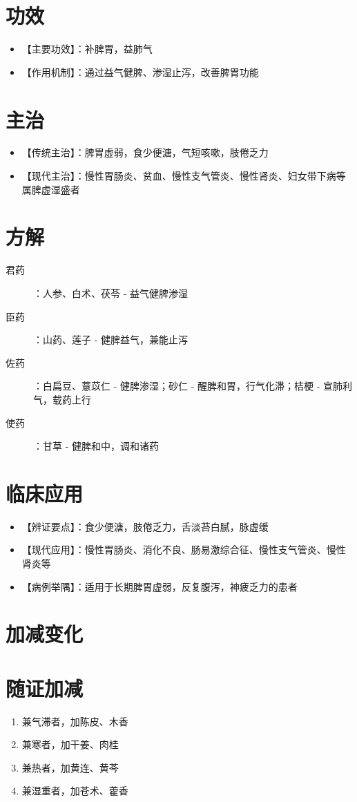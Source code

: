 \documentclass[12pt,UTF8]{ctexbook}
\newenvironment{fangji}[1]{\section{#1}\begin{enumerate}[leftmargin=2cm]}{\end{enumerate}}
\begin{document}
\section{功效}
\begin{itemize}
	\item 【主要功效】：补脾胃，益肺气
	\item 【作用机制】：通过益气健脾、渗湿止泻，改善脾胃功能
\end{itemize}

\section{主治}
\begin{itemize}
	\item 【传统主治】：脾胃虚弱，食少便溏，气短咳嗽，肢倦乏力
	\item 【现代主治】：慢性胃肠炎、贫血、慢性支气管炎、慢性肾炎、妇女带下病等属脾虚湿盛者
\end{itemize}

\section{方解}
\begin{description}
	\item[君药]：人参、白术、茯苓 - 益气健脾渗湿
	\item[臣药]：山药、莲子 - 健脾益气，兼能止泻
	\item[佐药]：白扁豆、薏苡仁 - 健脾渗湿；砂仁 - 醒脾和胃，行气化滞；桔梗 - 宣肺利气，载药上行
	\item[使药]：甘草 - 健脾和中，调和诸药
\end{description}

\section{临床应用}
\begin{itemize}
	\item 【辨证要点】：食少便溏，肢倦乏力，舌淡苔白腻，脉虚缓
	\item 【现代应用】：慢性胃肠炎、消化不良、肠易激综合征、慢性支气管炎、慢性肾炎等
	\item 【病例举隅】：适用于长期脾胃虚弱，反复腹泻，神疲乏力的患者
\end{itemize}

\section{加减变化}
\begin{fangji}{随证加减}
	\item 兼气滞者，加陈皮、木香
	\item 兼寒者，加干姜、肉桂
	\item 兼热者，加黄连、黄芩
	\item 兼湿重者，加苍术、藿香
\end{fangji}
\end{document}
